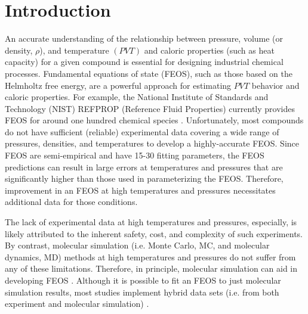 \documentclass[journal=jctc,manuscript=article]{achemso}
\begin{document}
\section{Introduction}

An accurate understanding of the relationship between pressure, volume (or density, $\rho$), and temperature $(PVT)$ and caloric properties (such as heat capacity) for a given compound is essential for designing industrial chemical processes. Fundamental equations of state (FEOS), such as those based on the Helmholtz free energy, are a powerful approach for estimating $PVT$ behavior and caloric properties. For example, the National Institute of Standards and Technology (NIST) REFPROP (Reference Fluid Properties) currently provides FEOS for around one hundred chemical species \cite{LEMMON-RP91}. Unfortunately, most compounds do not have sufficient (reliable) experimental data covering a wide range of pressures, densities, and temperatures to develop a highly-accurate FEOS. Since FEOS are semi-empirical and have 15-30 fitting parameters, the FEOS predictions can result in large errors at temperatures and pressures that are significantly higher than those used in parameterizing the FEOS. Therefore, improvement in an FEOS at high temperatures and pressures necessitates additional data for those conditions.

The lack of experimental data at high temperatures and pressures, especially, is likely attributed to the inherent safety, cost, and complexity of such experiments. By contrast, molecular simulation (i.e. Monte Carlo, MC, and molecular dynamics, MD) methods at high temperatures and pressures do not suffer from any of these limitations. Therefore, in principle, molecular simulation can aid in developing FEOS \cite{Thol2016_LJ,Thol_LJTS,Rutkai2017,Lustig2015,Rutkai2015}. Although it is possible to fit an FEOS to just molecular simulation results, most studies implement hybrid data sets (i.e. from both experiment and molecular simulation) \cite{Rutkai2013}.
\end{document}
